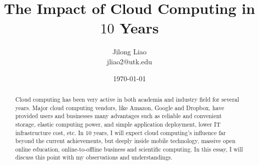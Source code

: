 \documentclass[11pt, journal, onecolumn]{IEEEtran}
\begin{document}
\title{The Impact of Cloud Computing in $10$ Years}
\author{Jilong Liao\\jliao2@utk.edu}
\date{\today}
\maketitle

\begin{abstract}
Cloud computing has been very active in both academia and industry field for several years. Major cloud computing vendors, like Amazon, Google and Dropbox, have provided users and businesses many advantages such as reliable and convenient storage, elastic computing power, and simple application deployment, lower IT infrastructure cost, etc. In $10$ years, I will expect cloud computing's influence far beyond the current achievements, but deeply inside mobile technology, massive open online education, online-to-offline business and scientific computing. In this essay, I will discuss this point with my observations and understandings.
\end{abstract}





\end{document}

